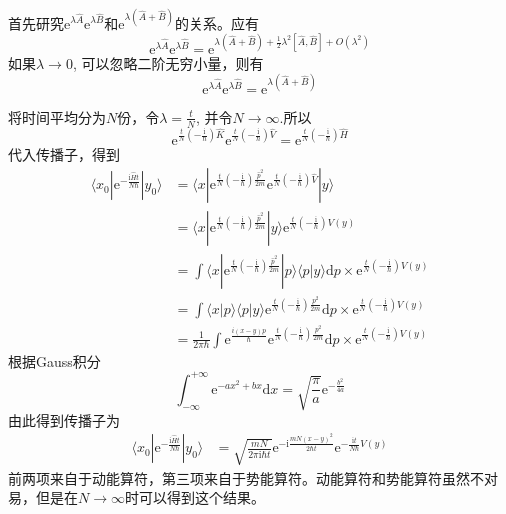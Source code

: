 \documentclass[12pt]{article}
\begin{document}
    首先研究$\mathrm{e}^{\lambda \hat{A}}\mathrm{e}^{\lambda \hat{B}}$和$\mathrm{e}^{\lambda (\hat{A}+\hat{B})}$的关系。应有
    \begin{equation*}
        \mathrm{e}^{\lambda \hat{A}} \mathrm{e}^{\lambda \hat{B}} = \mathrm{e}^{\lambda (\hat{A}+\hat{B}) + \frac 12 \lambda^2 [\hat{A},\hat{B}] + O(\lambda^2)}
    \end{equation*}
    如果$\lambda \to 0$, 可以忽略二阶无穷小量，则有
    \begin{equation*}
        \mathrm{e}^{\lambda \hat{A}} \mathrm{e}^{\lambda \hat{B}} = \mathrm{e}^{\lambda (\hat{A}+\hat{B})}
    \end{equation*}

    将时间平均分为$N$份，令$\lambda = \frac tN$, 并令$N \to \infty$.所以
    \begin{equation*}
        \mathrm{e}^{\frac tN (-\frac {\mathrm{i}}{\hbar}) \hat{K}} \mathrm{e}^{\frac tN (-\frac {\mathrm{i}}{\hbar}) \hat{V}} =\mathrm{e}^{\frac tN (-\frac {\mathrm{i}}{\hbar}) \hat{H}} 
    \end{equation*}
    代入传播子，得到
    \begin{align*}
        \langle x_0 | \mathrm{e}^{-\frac {\mathrm{i}\hat{H}t}{N\hbar}} | y_0 \rangle &= \langle x | \mathrm{e}^{\frac tN (-\frac {\mathrm{i}}{\hbar}) \frac {\hat{p}^2}{2m}}
        \mathrm{e}^{\frac tN (-\frac {\mathrm{i}}{\hbar}) \hat{V}} |y \rangle\\
        &= \langle x | \mathrm{e}^{\frac tN (-\frac {\mathrm{i}}{\hbar}) \frac {\hat{p}^2}{2m}} |y \rangle \mathrm{e}^{\frac tN (-\frac {\mathrm{i}}{\hbar}) V(y)}\\
        &= \int \langle x | \mathrm{e}^{\frac tN (-\frac {\mathrm{i}}{\hbar}) \frac {\hat{p}^2}{2m}} |p \rangle \langle p |y \rangle \mathrm{d}p \times \mathrm{e}^{\frac tN (-\frac {\mathrm{i}}{\hbar}) V(y)}\\
        &= \int \langle x|p \rangle \langle p|y \rangle \mathrm{e}^{\frac tN (-\frac {\mathrm{i}}{\hbar}) \frac {p^2}{2m}} \mathrm{d}p \times \mathrm{e}^{\frac tN (-\frac {\mathrm{i}}{\hbar}) V(y)}\\
        &= \frac 1{2\pi \hbar} \int \mathrm{e}^{\frac {i(x-y)p}{\hbar}} \mathrm{e}^{\frac tN (-\frac {\mathrm{i}}{\hbar}) \frac {p^2}{2m}} \mathrm{d}p \times \mathrm{e}^{\frac tN (-\frac {\mathrm{i}}{\hbar}) V(y)}
    \end{align*}
    根据Gauss积分
    \begin{equation*}
        \int_{-\infty}^{+\infty} \mathrm{e}^{-ax^2+bx} \mathrm{d}x = \sqrt{\frac {\pi}a} \mathrm{e}^{-\frac {b^2}{4a}}
    \end{equation*}
    由此得到传播子为
    \begin{align*}
        \langle x_0 | \mathrm{e}^{-\frac {\mathrm{i}\hat{H}t}{N\hbar}} | y_0 \rangle &= \sqrt{\frac {mN}{2\pi\mathrm{i} \hbar t}} \mathrm{e}^{-\mathrm{i}\frac {mN(x-y)^2}{2\hbar t}}\mathrm{e}^{-\frac {\mathrm{i}t}{N\hbar} V(y)}
    \end{align*}
    前两项来自于动能算符，第三项来自于势能算符。动能算符和势能算符虽然不对易，但是在$N \to \infty$时可以得到这个结果。
\end{document}
